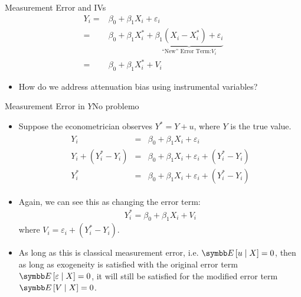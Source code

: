 \documentclass[aspectratio=169,11pt]{beamer}
\begin{document}
\begin{frame}{Measurement Error and IVs}
		\begin{align*}
			Y_i =& \beta_0 + \beta_1 X_i + \varepsilon_i\\
				=& \beta_0 + \beta_1 X_i^* + \underbrace{\beta_1(X_i - X_i^*) + \varepsilon_i}_{\text{``New'' Error Term:} V_i}\\
				=& \beta_0 + \beta_1 X_i^* + V_i
		\end{align*}
\begin{itemize}
	\item How do we address attenuation bias using instrumental variables? 
\end{itemize}
\end{frame}



\begin{frame}{Measurement Error in $Y$}{No problemo}	
	\begin{itemize}
		\item Suppose the econometrician observes $Y^{*} = Y + u$, where $Y$ is the true value.
\begin{align*}
\begin{array}{ccl}
Y_{i} & = & \beta_{0}+\beta_{1}X_{i}+\varepsilon_{i}\\
Y_{i}+(Y_{i}^{*}-Y_{i}) & = & \beta_{0}+\beta_{1}X_{i}+\varepsilon_{i}+(Y_{i}^{*}-Y_{i})\\
Y_{i}^{*} & = & \beta_{0}+\beta_{1}X_{i}+\varepsilon_{i}+\left(Y_{i}^{*}-Y_{i}\right)
\end{array}
\end{align*}
	\item Again, we can see this as changing the error term:
\begin{align*}
Y_{i}^{*}=\beta_{0}+\beta_{1}X_{i}+V_{i}
\end{align*}
where $V_{i}=\varepsilon_{i}+\left(Y_{i}^{*}-Y_{i}\right).$	
		
		\item As long as this is classical measurement error, i.e. $\E\left[u \mid X\right]= 0$,
		then as long as exogeneity is satisfied with the original error term $\E\left[\varepsilon \mid X\right]=0$,
		it will still be satisfied for the modified error term $\E\left[V \mid X\right]=0$.
		
\end{itemize}
\end{frame}		
\end{document}
